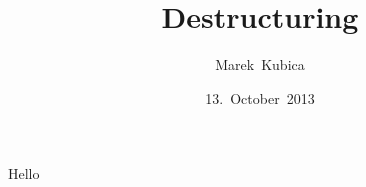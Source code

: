 

\title{Destructuring}
\author{Marek~Kubica}
\date{13.~October~2013}



\frame{\titlepage}

\begin{frame}
  Hello
\end{frame}


